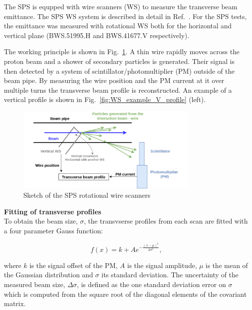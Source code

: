 The SPS is equpped with wire scanners (WS) to measure the transverse beam emittance. The SPS WS system is described in detail in Ref.~\cite{BOSSER1985475, Berrig:1972478}. For the SPS tests, the emittance was measured with rotational WS both for the horizontal and vertical plane (BWS.51995.H and BWS.41677.V respectively).

The working principle is shown in Fig.~\ref{fig:SPS_WS_ROT}. A thin wire rapidly moves across the proton beam and a shower of secondary particles is generated. Their signal is then detected by a system of scintillator/photomultiplier (PM) outside of the beam pipe. By measuring the wire position and the PM current at it over multiple turns the transverse beam profile is reconstructed. An example of a vertical profile is shown in Fig.~\ref{fig:WS_example_V_profile} (left).


\begin{figure}[!h]
   \centering         
   \includegraphics[width=0.8\textwidth]{images/Ch4/Wire_scanner.png}
       \caption{Sketch of the SPS rotational wire scanners~\cite{Berrig:1972478}}
       \label{fig:SPS_WS_ROT}
\end{figure}


\normalsize{\textbf{Fitting of transverse profiles}}\\
To obtain the beam size, $\sigma$, the transvserse profiles from each scan are fitted with a four parameter Gauss function:

\begin{equation}\label{eq:4p_gauss}
   f(x) = k + A e^{-\frac{(x-\mu)^2}{2 \sigma^2}},
\end{equation}

where $k$ is the signal offset of the PM, $A$ is the signal amplitude, $\mu$ is the mean of the Gaussian distribution and $\sigma$ its standard deviation. The uncertainty of the measured beam size, $\Delta \sigma$, is defined as the one standard deviation error on $\sigma$ which is computed from the square root of the diagonal elements of the covariant matrix.

